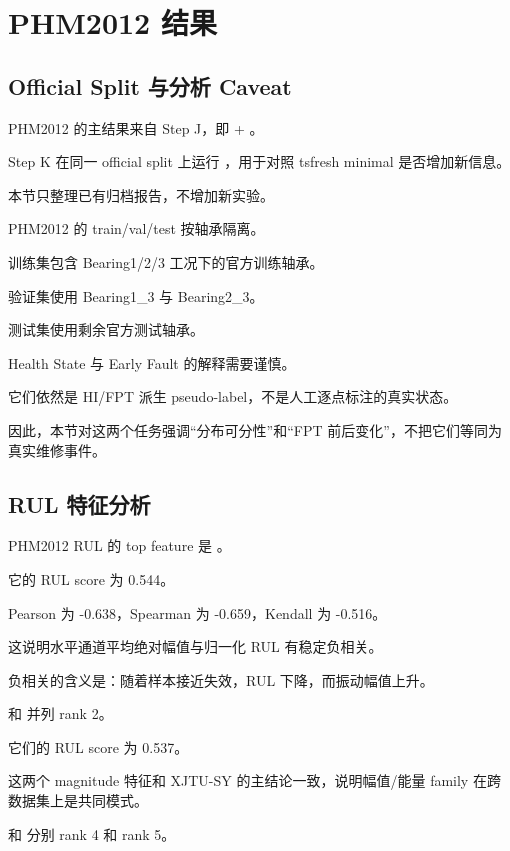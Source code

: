 \section{PHM2012 结果}

\subsection{Official Split 与分析 Caveat}

PHM2012 的主结果来自 Step J，即  + 。

Step K 在同一 official split 上运行 ，用于对照 tsfresh minimal 是否增加新信息。

本节只整理已有归档报告，不增加新实验。

PHM2012 的 train/val/test 按轴承隔离。

训练集包含 Bearing1/2/3 工况下的官方训练轴承。

验证集使用 Bearing1\_3 与 Bearing2\_3。

测试集使用剩余官方测试轴承。

Health State 与 Early Fault 的解释需要谨慎。

它们依然是 HI/FPT 派生 pseudo-label，不是人工逐点标注的真实状态。

因此，本节对这两个任务强调“分布可分性”和“FPT 前后变化”，不把它们等同为真实维修事件。



\subsection{RUL 特征分析}

PHM2012 RUL 的 top feature 是 。

它的 RUL score 为 0.544。

Pearson 为 -0.638，Spearman 为 -0.659，Kendall 为 -0.516。

这说明水平通道平均绝对幅值与归一化 RUL 有稳定负相关。

负相关的含义是：随着样本接近失效，RUL 下降，而振动幅值上升。

 和  并列 rank 2。

它们的 RUL score 为 0.537。

这两个 magnitude 特征和 XJTU-SY 的主结论一致，说明幅值/能量 family 在跨数据集上是共同模式。

 和  分别 rank 4 和 rank 5。

